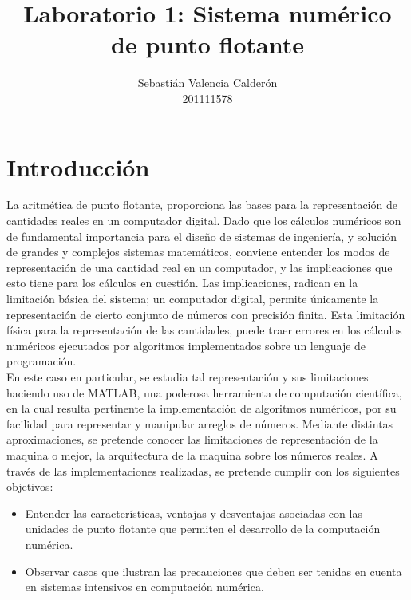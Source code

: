 \documentclass[11pt, spanish]{article}
\date{}
\begin{document}
\renewcommand\lstlistlistingname{Lista de Scripts}

\author{Sebastián Valencia Calderón \\ 201111578}
\title{Laboratorio 1: Sistema numérico de punto flotante}
\maketitle

\section{Introducción}

La aritmética de punto flotante, proporciona las bases para la representación de cantidades reales en un computador digital. Dado que los cálculos numéricos son de fundamental importancia para el diseño de sistemas de ingeniería, y solución de grandes y complejos sistemas matemáticos, conviene entender los modos de representación de una cantidad real en un computador, y las implicaciones que esto tiene para los cálculos en cuestión. Las implicaciones, radican en la limitación básica del sistema; un computador digital, permite únicamente la representación de cierto conjunto de números con precisión finita. Esta limitación física para la representación de las cantidades, puede traer errores en los cálculos numéricos ejecutados por algoritmos implementados sobre un lenguaje de programación.\\

En este caso en particular, se estudia tal representación y sus limitaciones haciendo uso de \textsc{MATLAB}, una poderosa herramienta de computación científica, en la cual resulta pertinente la implementación de algoritmos numéricos, por su facilidad para representar y manipular arreglos de números. Mediante distintas aproximaciones, se pretende conocer las limitaciones de representación de la maquina o mejor, la arquitectura de la maquina sobre los números reales. A través de las implementaciones realizadas, se pretende cumplir con los siguientes objetivos:

\begin{itemize}
\item Entender las características, ventajas y desventajas asociadas con las unidades de punto flotante que permiten el desarrollo de la computación numérica.

\item Observar casos que ilustran las precauciones que deben ser tenidas en cuenta en sistemas intensivos en computación numérica.
\end{itemize}
\end{document}
